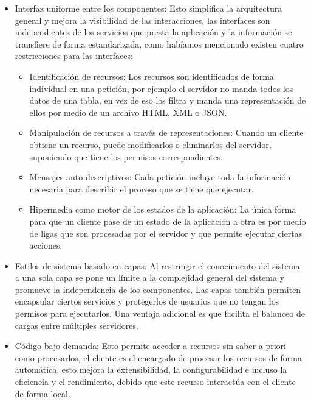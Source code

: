 \documentclass[12pt,a4paper,spanish,openany]{book}
\begin{document}
\begin{itemize}
    
    \item Interfaz uniforme entre los componentes: Esto simplifica la
    arquitectura general y mejora la visibilidad de las interacciones, las
    interfaces son independientes de los servicios que presta la aplicación y la
    información se transfiere de forma estandarizada, como habíamos
    mencionado existen cuatro restricciones para las interfaces:
        \begin{itemize}
            \item Identificación de recursos: Los recursos son identificados de
            forma individual en una petición, por ejemplo el servidor no manda
            todos los datos de una tabla, en vez de eso los filtra y manda una
            representación de ellos por medio de un archivo HTML, XML o JSON.
            \item Manipulación de recursos a través de representaciones: Cuando
            un cliente obtiene un recurso, puede modificarlos o eliminarlos del
            servidor, suponiendo que tiene los permisos correspondientes.
            \item Mensajes auto descriptivos: Cada petición incluye toda la
            información necesaria para describir el proceso que se tiene que
            ejecutar.
            \item Hipermedia como motor de los estados de la aplicación: La
            única forma para que un cliente pase de un estado de la aplicación a
            otra es por medio de ligas que son procesadas por el servidor y que
            permite ejecutar ciertas acciones.
        \end{itemize}    
      
   
    \item Estilos de sistema basado en capas: Al restringir el conocimiento del
    sistema a una sola capa se pone un límite a la complejidad general del
    sistema y promueve la independencia de los componentes. Las capas también
    permiten encapsular ciertos servicios y protegerlos de usuarios que no
    tengan los permisos para ejecutarlos. Una ventaja adicional es que facilita
    el balanceo de cargas entre múltiples servidores.
    
    \item Código bajo demanda: Esto permite acceder a recursos sin saber a
    priori como procesarlos, el cliente es el encargado de procesar los recursos
    de forma automática, esto mejora la
    extensibilidad, la configurabilidad e incluso la eficiencia y el rendimiento, debido que este recurso interactúa
    con el cliente de forma local.

\end{itemize}
\end{document}

